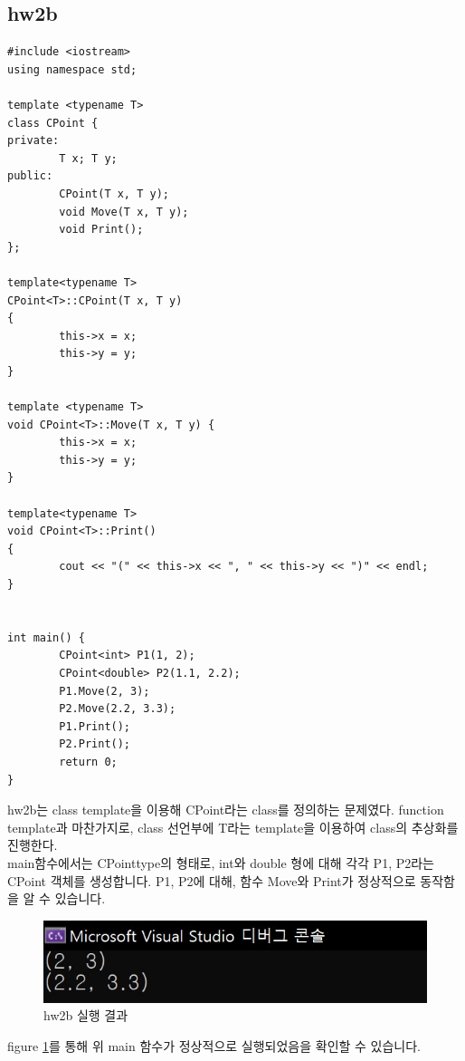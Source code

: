 \documentclass{article}
\begin{document}
\subsection{hw2b}
\begin{verbatim}
#include <iostream>
using namespace std;

template <typename T>
class CPoint {
private:
    	T x; T y;
public:
    	CPoint(T x, T y);
    	void Move(T x, T y);
    	void Print();
};

template<typename T>
CPoint<T>::CPoint(T x, T y)
{
    	this->x = x;
    	this->y = y;
}

template <typename T>
void CPoint<T>::Move(T x, T y) {
    	this->x = x;
    	this->y = y;
}

template<typename T>
void CPoint<T>::Print()
{
    	cout << "(" << this->x << ", " << this->y << ")" << endl;
}


int main() {
        CPoint<int> P1(1, 2);
        CPoint<double> P2(1.1, 2.2);
        P1.Move(2, 3);
        P2.Move(2.2, 3.3);
        P1.Print();
        P2.Print();
        return 0;
}
\end{verbatim}
hw2b는 class template을 이용해 CPoint라는 class를 정의하는 문제였다. function template과 마찬가지로, class 선언부에 T라는 template을 이용하여 class의 추상화를 진행한다. \\
main함수에서는 CPoint\<type\>의 형태로, int와 double 형에 대해 각각 P1, P2라는 CPoint 객체를 생성합니다. P1, P2에 대해, 함수 Move와 Print가 정상적으로 동작함을 알 수 있습니다.
\begin{figure} [h]
    \centering
    \includegraphics{hw2b result.jpg}
    \caption{hw2b 실행 결과}
    \label{fig:hw2b result}
\end{figure}
figure \ref{fig:hw2b result}를 통해 위 main 함수가 정상적으로 실행되었음을 확인할 수 있습니다.
\end{document}
